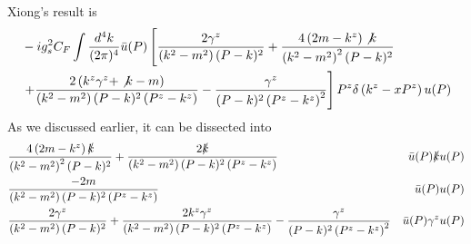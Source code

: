 \documentclass{article}
\begin{document}
Xiong's result is
\begin{align}
	  & -i g_{s}^{2} C_{F} \int \frac{d^{4} k}{(2 \pi)^{4}} \bar{u}(P)\left[
		\frac{2 \gamma^{z}}{\left(k^{2}-m^{2}\right)(P-k)^{2}}
		+\frac{4\left(2 m-k^{z}\right) \not k}{\left(k^{2}-m^{2}\right)^{2}(P-k)^{2}}\right.\notag\\
	  & \left.+\frac{2\left(k^{z} \gamma^{z}+\not k-m\right)}{\left(k^{2}-m^{2}\right)(P-k)^{2}\left(P^{z}-k^{z}\right)}
		-\frac{\gamma^{z}}{(P-k)^{2}\left(P^{z}-k^{z}\right)^{2}}
		\right] P^{z} \delta\left(k^{z}-x P^{z}\right) u(P)
\end{align}
As we discussed earlier, it can be dissected into
\begin{align}
	  & \frac{4\left(2 m-k^{z}\right) \slashed k}{\left(k^{2}-m^{2}\right)^{2}(P-k)^{2}}+\frac{2\slashed k}{\left(k^{2}-m^{2}\right)(P-k)^{2}\left(P^{z}-k^{z}\right)}                                    & \bar u(P)\slashed{k}u(P) \\
	  & \frac{-2m}{\left(k^{2}-m^{2}\right)(P-k)^{2}\left(P^{z}-k^{z}\right)}                                                                                                                             & \bar u(P)u(P)            \\
	  & \frac{2 \gamma^z}{\left(k^{2}-m^{2}\right)(P-k)^{2}}+\frac{2k^{z} \gamma^{z}}{\left(k^{2}-m^{2}\right)(P-k)^{2}\left(P^{z}-k^{z}\right)}-\frac{\gamma^{z}}{(P-k)^{2}\left(P^{z}-k^{z}\right)^{2}} & \bar u(P)\gamma^zu(P)
\end{align}

\clearpage
\printendnotes



\end{document}

